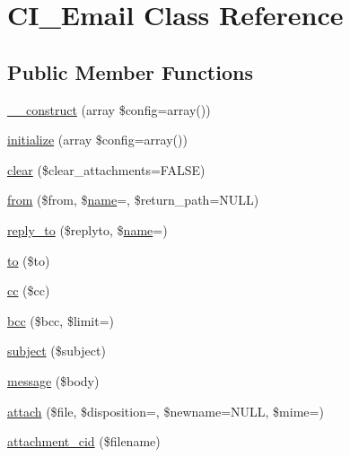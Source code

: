 \hypertarget{class_c_i___email}{}\section{C\+I\+\_\+\+Email Class Reference}
\label{class_c_i___email}
\subsection*{Public Member Functions}
\begin{DoxyCompactItemize}
\item 
\mbox{\hyperlink{class_c_i___email_a35018c0dc92a448db5c4686364ced754}{\+\_\+\+\_\+construct}} (array \$config=array())
\item 
\mbox{\hyperlink{class_c_i___email_accdda1f75fbf89ca5d63af410e60ee6d}{initialize}} (array \$config=array())
\item 
\mbox{\hyperlink{class_c_i___email_a84399b20dfff67877099743270c68538}{clear}} (\$clear\+\_\+attachments=F\+A\+L\+SE)
\item 
\mbox{\hyperlink{class_c_i___email_adfec40d06e4f3fcae4e2059dee1c26d0}{from}} (\$from, \$\mbox{\hyperlink{waiter_2order_8php_afb270cde4944e425a37cf277116a7f43}{name}}=\textquotesingle{}\textquotesingle{}, \$return\+\_\+path=N\+U\+LL)
\item 
\mbox{\hyperlink{class_c_i___email_a1ee2303dece90d5b3afbb5dc75b9a0ca}{reply\+\_\+to}} (\$replyto, \$\mbox{\hyperlink{waiter_2order_8php_afb270cde4944e425a37cf277116a7f43}{name}}=\textquotesingle{}\textquotesingle{})
\item 
\mbox{\hyperlink{class_c_i___email_a453e853778ae341e4fb165551d1ba1aa}{to}} (\$to)
\item 
\mbox{\hyperlink{class_c_i___email_a785e883837f95eeffed21226563fc7e5}{cc}} (\$cc)
\item 
\mbox{\hyperlink{class_c_i___email_ae7da2abc30865dd8ba3fcb3366889d7a}{bcc}} (\$bcc, \$limit=\textquotesingle{}\textquotesingle{})
\item 
\mbox{\hyperlink{class_c_i___email_aaa61b3aaa6cc4c90e26686e4bf41587a}{subject}} (\$subject)
\item 
\mbox{\hyperlink{class_c_i___email_a62559aacd297073072c30009daa8de86}{message}} (\$body)
\item 
\mbox{\hyperlink{class_c_i___email_adb1bcf392d6cf38e3f94675a21cab563}{attach}} (\$file, \$disposition=\textquotesingle{}\textquotesingle{}, \$newname=N\+U\+LL, \$mime=\textquotesingle{}\textquotesingle{})
\item 
\mbox{\hyperlink{class_c_i___email_afd601b1ddbb0fc02f16f2e39d9881299}{attachment\+\_\+cid}} (\$filename)

\end{DoxyCompactItemize}
